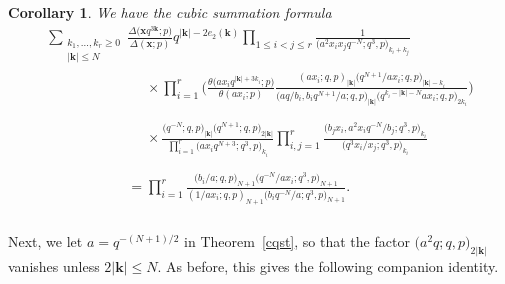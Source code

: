 \documentclass[pdftex]{sigma}%
\numberwithin{equation}{section}
\newtheorem{Corollary}[Theorem]{Corollary}
\def\ta{\theta}
\newcommand\bk{\mathbf k}
\newcommand\bx{\mathbf x}
\begin{document}
\begin{Corollary}\label{cssa}
We have the cubic summation formula
\begin{gather*}
\sum_{\substack{k_1,\dots,k_r\geq 0\\|\bk |\leq N}}
\frac{\Delta\big(\bx q^{3\bk};p\big)}{\Delta(\bx;p)}q^{|\bk|-2e_2(\bk)}
\prod\limits_{1\le i<j\le r}\frac 1{\big(a^2x_ix_jq^{-N};q^3,p\big) _{k_i+k_j}}
\\[-1ex] \phantom{\sum_{\substack{k_1,\dots,k_r\geq 0\\|\bk |\leq N}}=}{}
\times
\prod\limits_{i=1}^{r}\bigg(\frac{\ta\big(ax_iq^{|\bk|+3k_i};p\big)}{\ta(ax_i;p)}
\frac {(ax_i;q,p)_{|\bk|}
\big(q^{N+1}/ax_i;q,p\big)_{|\bk|-k_i}}
{\big(aq/b_i,b_iq^{N+1}/a;q,p\big)_{|\bk|}\big(q^{k_i-|\bk|-N}ax_i;q,p\big)_{2k_i}}\bigg)
\\[-1ex] \phantom{\sum_{\substack{k_1,\dots,k_r\geq 0\\|\bk |\leq N}}=}{}
\times
\frac{\big(q^{-N};q,p\big)_{|\bk|} \big(q^{N+1};q,p\big)_{2|\bk|}}
{\prod\limits_{i=1}^{r}\big(ax_iq^{N+3};q^3,p\big)_{k_i}}
\prod\limits_{i,j=1}^{r}\frac{\big(b_jx_i,a^2x_iq^{-N}/b_j;q^3,p\big)_{k_i}}
{\big(q^3x_i/x_j;q^3,p\big)_{k_i}}
\\[-1ex] \phantom{\sum_{\substack{k_1,\dots,k_r\geq 0\\|\bk |\leq N}}}{}
=\prod\limits_{i=1}^{r}\frac{\big(b_i/a;q,p\big)_{N+1} \big(q^{-N}/ax_i;q^3,p\big)_{N+1}}
{(1/ax_i;q,p)_{N+1} \big(b_iq^{-N}/a;q^3,p\big)_{N+1}}.
\end{gather*}
\end{Corollary}

Next, we let $a=q^{-(N+1)/2}$ in Theorem~\ref{cqst}, so that the factor $\big(a^2q;q,p\big)_{2|\bk|}$ vanishes unless $2|\bk|\leq N$.
As before, this gives the following companion identity.
\end{document}
